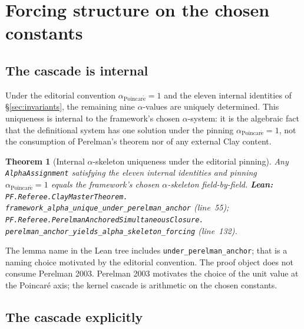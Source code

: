 \documentclass[11pt,a4paper]{article}
\theoremstyle{plain}
\newtheorem{theorem}{Theorem}[section]
\theoremstyle{definition}
\begin{document}
\section{Forcing structure on the chosen constants}
\label{sec:forcing}

\subsection{The cascade is internal}
\label{sec:forcing-internal}

Under the editorial convention $\alpha_{\mathrm{Poincar\acute e}}
= 1$ and the eleven internal identities of
\S\ref{sec:invariants}, the remaining nine $\alpha$-values are
uniquely determined. This uniqueness is internal to the
framework's chosen $\alpha$-system: it is the algebraic fact
that the definitional system has one solution under the pinning
$\alpha_{\mathrm{Poincar\acute e}} = 1$, not the consumption of
Perelman's theorem nor of any external Clay content.

\begin{theorem}[Internal $\alpha$-skeleton uniqueness under the
editorial pinning]
\label{thm:alpha-forcing}
Any \texttt{AlphaAssignment} satisfying the eleven internal
identities and pinning $\alpha_{\mathrm{Poincar\acute e}} = 1$
equals the framework's chosen $\alpha$-skeleton field-by-field.
\textbf{Lean:}
\texttt{PF.Referee.ClayMasterTheorem.\\
framework\_alpha\_unique\_under\_perelman\_anchor}
(line~55);
\texttt{PF.Referee.PerelmanAnchoredSimultaneousClosure.\\
perelman\_anchor\_yields\_alpha\_skeleton\_forcing} (line~132).
\end{theorem}

The lemma name in the Lean tree includes
\texttt{under\_perelman\_anchor}; that is a naming choice
motivated by the editorial convention. The proof object does
not consume Perelman 2003. Perelman 2003 motivates the choice of
the unit value at the Poincar\'e axis; the kernel cascade is
arithmetic on the chosen constants.

\subsection{The cascade explicitly}
\label{sec:forcing-chain}
\end{document}
